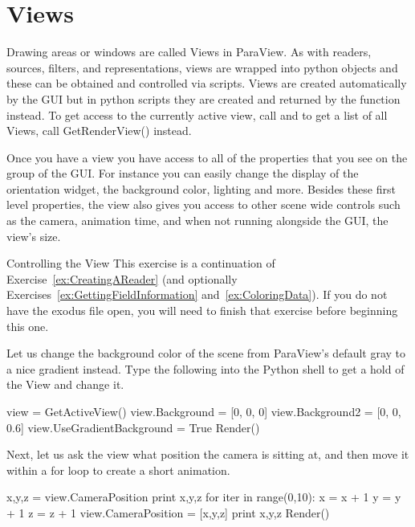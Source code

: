 \section{Views}
\label{sec:Views}

Drawing areas or windows are called Views in ParaView.
As with readers, sources, filters, and representations, views are wrapped
into python objects and these can be obtained and controlled via scripts.
Views are created automatically by the GUI but in python scripts they are created and returned by the  function instead.
To get access to the currently active view, call  and to get a list of all Views, call GetRenderView() instead.

Once you have a view you have access to all of the properties that you see on
the  group of the GUI. For instance you can easily change the
display of the orientation widget, the background color, lighting and more.
Besides these first level properties, the view also gives you access to other scene wide controls such as the camera, animation time, and when not running alongside the GUI, the view's size.

\begin{exercise}{Controlling the View}
  \label{ex:ControlView}%
  This exercise is a continuation of Exercise~\ref{ex:CreatingAReader} (and
  optionally Exercises~\ref{ex:GettingFieldInformation}
  and~\ref{ex:ColoringData}).
  If you do not have the exodus file open, you will need to finish that
  exercise before beginning this one.

  Let us change the background color of the scene from ParaView's default gray 
  to a nice gradient instead. Type the following into the Python shell
  to get a hold of the View and change it.

  \begin{python}
view = GetActiveView()
view.Background = [0, 0, 0]
view.Background2 = [0, 0, 0.6]
view.UseGradientBackground = True
Render()
  \end{python}

  Next, let us ask the view what position the camera is sitting at, and
  then move it within a for loop to create a short animation.
  \begin{python}
x,y,z = view.CameraPosition
print x,y,z
for iter in range(0,10):
  x = x + 1
  y = y + 1
  z = z + 1
  view.CameraPosition = [x,y,z]
  print x,y,z
  Render()
  \end{python}

\end{exercise}


